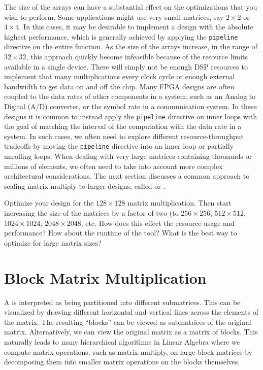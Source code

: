 The size of the arrays can have a substantial effect on the optimizations that you wish to perform. Some applications might use very small matrices, say $2 \times 2$ or $4 \times 4$. In this cases, it may be desirable to implement a design with the absolute highest performance, which is generally achieved by applying the \lstinline{pipeline} directive on the entire function.   As the size of the arrays increase, in the range of $32 \times 32$, this approach quickly become infeasible because of the resource limits available in a single device.  There will simply not be enough DSP resources to implement that many multiplications every clock cycle or enough external bandwidth to get data on and off the chip.  Many FPGA designs are often coupled to the data rates of other components in a system, such as an Analog to Digital (A/D) converter, or the symbol rate in a communication system.  In these designs it is common to instead apply the \lstinline|pipeline| directive on inner loops with the goal of matching the interval of the computation with the data rate in a system.  In such cases, we often need to explore different resource-throughput tradeoffs by moving the \lstinline{pipeline} directive into an inner loop or partially unrolling loops. When  
 dealing with very large matrices containing thousands or millions of elements, we often need to take into account more complex architectural considerations.  The next section discusses a common approach to scaling matrix multiply to larger designs, called  or .

\begin{exercise}
Optimize your design for the $128 \times 128$ matrix multiplication. Then start increasing the size of the matrices by a factor of two (to $256 \times 256$, $512 \times 512$, $1024 \times 1024$, $2048 \times 2048$, etc. How does this effect the resource usage and performance? How about the runtime of the tool? What is the best way to optimize for large matrix sizes?
\end{exercise}

\section{Block Matrix Multiplication}

A  is interpreted as being partitioned into different submatrices. This can be visualized by drawing different horizontal and vertical lines across the elements of the matrix. The resulting ``blocks'' can be viewed as submatrices of the original matrix.  Alternatively, we can view the original matrix as a matrix of blocks.  This naturally leads to many hierarchical algorithms in Linear Algebra where we compute matrix operations, such as matrix multiply, on large block matrices by decomposing them into smaller matrix operations on the blocks themselves.

